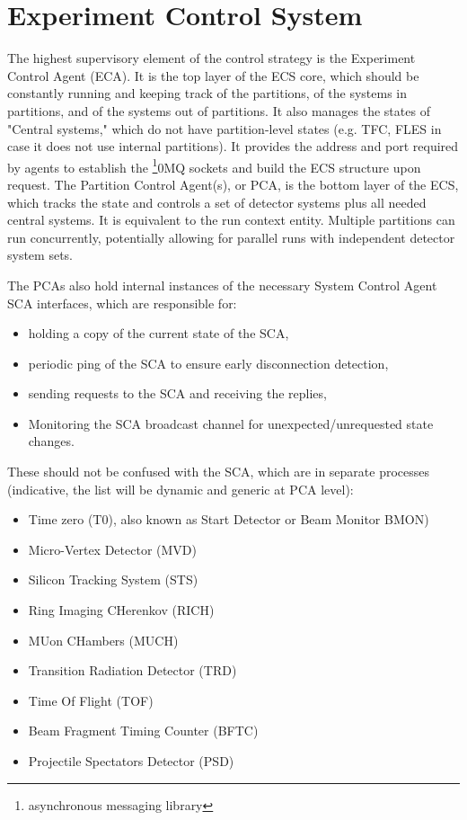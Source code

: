 \section{Experiment Control System}\label{sssAgents}
The highest supervisory element of the control strategy is the Experiment Control Agent 
(\gls{ECA}). It is the top layer of the \gls{ECS} core, which should be constantly running and keeping track of the partitions, of the systems in partitions, and of the systems out of partitions. It also manages the states of "Central systems," which do not have partition-level states (e.g. \gls{TFC}, \gls{FLES} in case it does not use internal partitions).  It provides the address and port required by agents to establish the \footnote{asynchronous messaging library}{0MQ} sockets and build the \gls{ECS} structure upon request. The Partition Control Agent(s), or \gls{PCA}, is the bottom layer of the \gls{ECS}, which tracks the state and controls a set of detector systems plus all needed central systems.  It is equivalent to the run context entity. Multiple partitions can run concurrently, potentially allowing for parallel runs with independent detector system sets. 

The \glspl{PCA} also hold internal instances of the necessary System Control Agent \gls{SCA} interfaces, which are responsible for:
\begin{itemize}
 \item holding a copy of the current state of the \gls{SCA},
 \item periodic ping of the \gls{SCA} to ensure early disconnection detection,
 \item sending requests to the \gls{SCA} and receiving the replies,
 \item Monitoring the \gls{SCA} broadcast channel for unexpected/unrequested state changes.
\end{itemize}
These should not be confused with the \gls{SCA}, which are in separate processes (indicative, the list will be dynamic and generic at \gls{PCA} level):

\begin{itemize}
 \item Time zero (T0), also known as Start Detector or Beam Monitor \gls{BMON})
 \item Micro-Vertex Detector (\gls{MVD})
 \item Silicon Tracking System (\gls{STS})
 \item Ring Imaging CHerenkov (\gls{RICH})
 \item MUon CHambers (\gls{MUCH})
 \item Transition Radiation Detector (\gls{TRD})
 \item Time Of Flight (\gls{TOF})
 \item Beam Fragment Timing Counter (\gls{BFTC})
 \item Projectile Spectators Detector (\gls{PSD})
\end{itemize}

